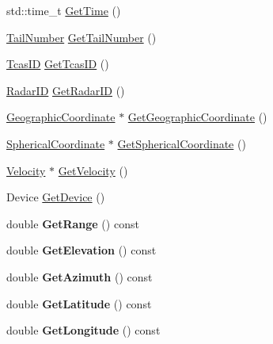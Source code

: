 \begin{DoxyCompactItemize}
\item 
std\+::time\+\_\+t \hyperlink{class_surveillance_report_ae52aeeaa07f1638d5d4b322fd559891d}{Get\+Time} ()
\item 
\hyperlink{class_tail_number}{Tail\+Number} \hyperlink{class_surveillance_report_a19bc85f8873738870547f7bf64d38904}{Get\+Tail\+Number} ()
\item 
\hyperlink{class_tcas_i_d}{Tcas\+I\+D} \hyperlink{class_surveillance_report_ac3573d0a6e830903dfd1237903ea1341}{Get\+Tcas\+I\+D} ()
\item 
\hyperlink{class_radar_i_d}{Radar\+I\+D} \hyperlink{class_surveillance_report_a50787dec983398c849d21596a027d282}{Get\+Radar\+I\+D} ()
\item 
\hyperlink{class_geographic_coordinate}{Geographic\+Coordinate} $\ast$ \hyperlink{class_surveillance_report_a0d28ae4b6b14547ad36ab01567c15e00}{Get\+Geographic\+Coordinate} ()
\item 
\hyperlink{class_spherical_coordinate}{Spherical\+Coordinate} $\ast$ \hyperlink{class_surveillance_report_a116bef3320ebaccc416c30fb6a3112bf}{Get\+Spherical\+Coordinate} ()
\item 
\hyperlink{class_velocity}{Velocity} $\ast$ \hyperlink{class_surveillance_report_a5246ec2f5c6b549293faa752faf103ce}{Get\+Velocity} ()
\item 
Device \hyperlink{class_surveillance_report_a982d05ee175ce7bbb7b4aaf224adeef9}{Get\+Device} ()
\item 
\hypertarget{class_surveillance_report_af1ae317f48c0d841c1fbc40ae20d535b}{}double {\bfseries Get\+Range} () const \label{class_surveillance_report_af1ae317f48c0d841c1fbc40ae20d535b}

\item 
\hypertarget{class_surveillance_report_a325b11ec60476cfcb04de46299dde87e}{}double {\bfseries Get\+Elevation} () const \label{class_surveillance_report_a325b11ec60476cfcb04de46299dde87e}

\item 
\hypertarget{class_surveillance_report_aa778b04e8a71709a4e14cd95c7f59bff}{}double {\bfseries Get\+Azimuth} () const \label{class_surveillance_report_aa778b04e8a71709a4e14cd95c7f59bff}

\item 
\hypertarget{class_surveillance_report_a0805dceb33dbe160bf5a37ebd4e8efdb}{}double {\bfseries Get\+Latitude} () const \label{class_surveillance_report_a0805dceb33dbe160bf5a37ebd4e8efdb}

\item 
\hypertarget{class_surveillance_report_a4fbbdd49981364af45848e84901639d8}{}double {\bfseries Get\+Longitude} () const \label{class_surveillance_report_a4fbbdd49981364af45848e84901639d8}


\end{DoxyCompactItemize}
